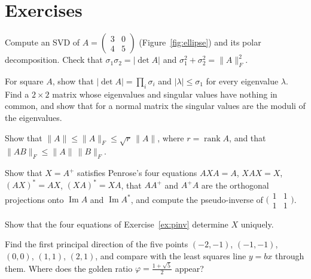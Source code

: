\section{Exercises}

\begin{exercise}[$\star$]\label{ex:svd2}
Compute an SVD of $A=\begin{pmatrix}3&0\\4&5\end{pmatrix}$ (Figure~\ref{fig:ellipse}) and its polar decomposition. Check that
$\sigma_1\sigma_2=|\det A|$ and $\sigma_1^2+\sigma_2^2=\|A\|_F^2$.
\end{exercise}

\begin{exercise}[$\star$]\label{ex:normsvd}
For square $A$, show that $|\det A|=\prod_i\sigma_i$ and $|\lambda|\le\sigma_1$ for every eigenvalue $\lambda$. Find a $2\times2$
matrix whose eigenvalues and singular values have nothing in common, and show that for a normal matrix the singular values
are the moduli of the eigenvalues.
\end{exercise}

\begin{exercise}[$\star$]\label{ex:normineq}
Show that $\|A\|\le\|A\|_F\le\sqrt r\,\|A\|$, where $r=\operatorname{rank}A$, and that $\|AB\|_F\le\|A\|\,\|B\|_F$.
\end{exercise}

\begin{exercise}[$\star$]\label{ex:pinv}
Show that $X=A^+$ satisfies Penrose's four equations $AXA=A$, $XAX=X$, $(AX)^*=AX$, $(XA)^*=XA$, that $AA^+$ and $A^+A$ are
the orthogonal projections onto $\operatorname{Im}A$ and $\operatorname{Im}A^*$, and compute the pseudo-inverse of
$\bigl(\begin{smallmatrix}1&1\\1&1\end{smallmatrix}\bigr)$.
\end{exercise}

\begin{exercise}[$\star\star$]\label{ex:penroseunique}
Show that the four equations of Exercise~\ref{ex:pinv} determine $X$ uniquely.
\end{exercise}

\begin{exercise}[$\star\star$]\label{ex:pcatoy}
Find the first principal direction of the five points $(-2,-1)$, $(-1,-1)$, $(0,0)$, $(1,1)$, $(2,1)$, and compare with
the least squares line $y=bx$ through them. Where does the golden ratio $\varphi=\frac{1+\sqrt5}2$ appear?
\end{exercise}

